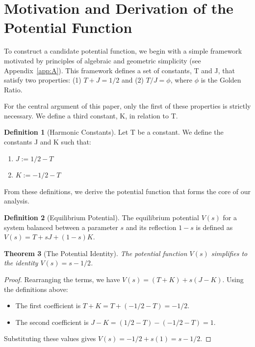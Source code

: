 \documentclass{amsart}
\theoremstyle{plain}
\newtheorem{theorem}{Theorem}[section]
\theoremstyle{definition}
\newtheorem{definition}[theorem]{Definition}
\theoremstyle{remark}
\begin{document}
\section{Motivation and Derivation of the Potential Function}
To construct a candidate potential function, we begin with a simple framework motivated by principles of algebraic and geometric simplicity (see Appendix~\ref{app:A}). This framework defines a set of constants, T and J, that satisfy two properties: (1) $T+J=1/2$ and (2) $T/J=\phi$, where $\phi$ is the Golden Ratio.

For the central argument of this paper, only the first of these properties is strictly necessary. We define a third constant, K, in relation to T.

\begin{definition}[Harmonic Constants]
Let T be a constant. We define the constants J and K such that:
\begin{enumerate}
    \item $J := 1/2 - T$
    \item $K := -1/2 - T$
\end{enumerate}
\end{definition}

From these definitions, we derive the potential function that forms the core of our analysis.
\begin{definition}[Equilibrium Potential]
The equilibrium potential $V(s)$ for a system balanced between a parameter $s$ and its reflection $1-s$ is defined as $V(s) = T + sJ + (1-s)K$.
\end{definition}

\begin{theorem}[The Potential Identity]
\label{thm:potential_id}
The potential function $V(s)$ simplifies to the identity $V(s) = s - 1/2$.
\end{theorem}
\begin{proof}
Rearranging the terms, we have $V(s) = (T+K) + s(J-K)$. Using the definitions above:
\begin{itemize}
    \item The first coefficient is $T+K = T + (-1/2 - T) = -1/2$.
    \item The second coefficient is $J-K = (1/2 - T) - (-1/2-T) = 1$.
\end{itemize}
Substituting these values gives $V(s) = -1/2 + s(1) = s - 1/2$.
\end{proof}
\end{document}
